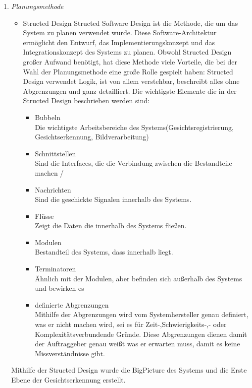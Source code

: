 \begin{enumerate}
\begin{itemize}
\begin{figure}[H]
		\end{figure}\cite{MariadbBild}
		\end{itemize}
	\item \textit{Planungsmethode} \\
		\begin{itemize}
			\item Structed Design
			Structed Software Design ist die Methode, die um das System zu planen verwendet wurde. Diese Software-Architektur ermöglicht den Entwurf, das Implementierungskonzept und das Integrationskonzept des Systems zu planen. Obwohl Structed Design großer Aufwand benötigt, hat diese Methode viele Vorteile, die bei der Wahl der Planungsmethode eine große Rolle gespielt haben: Structed Design verwendet Logik, ist von allem verstehbar, beschreibt alles ohne Abgrenzungen und ganz detailliert. Die wichtigste Elemente die in der Structed Design beschrieben werden sind:
			\begin{itemize}
				\item Bubbeln \\
				Die wichtigste Arbeitsbereiche des Systems(Gesichtsregistrierung, Gesichtserkennung, Bildverarbeitung)
				\item Schnittstellen \\
				Sind die Interfaces, die die Verbindung zwischen die Bestandteile machen /
				\item Nachrichten \\
				Sind die geschickte Signalen innerhalb des Systems.
				\item Flüsse \\
				Zeigt die Daten die innerhalb des Systems fließen.
				\item Modulen \\
				Bestandteil des Systems, dass innerhalb liegt.
				\item Terminatoren \\
				Ähnlich mit der Modulen, aber befinden sich außerhalb des Systems und bewirken es
				\item definierte Abgrenzungen \\
				Mithilfe der Abgrenzungen wird vom Systemhersteller genau definiert, was er nicht machen wird, sei es für Zeit-,Schwierigkeits-,- oder Komplexitätsverbundende Gründe. Diese Abgrenzungen dienen damit der Auftraggeber genau weißt was er erwarten muss, damit es keine Missverständnisse gibt.\cite{StructedDesign}
			\end{itemize}
		\end{itemize}
	Mithilfe der Structed Design wurde die BigPicture des Systems und die Erste Ebene der Gesichtserkennung erstellt. 
\end{enumerate}
